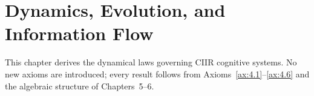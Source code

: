 %
%
%
%

%
%

\section{Dynamics, Evolution, and Information Flow}
\label{sec:ch7:dynamics}

This chapter derives the dynamical laws governing CIIR cognitive systems.
No new axioms are introduced; every result follows from
Axioms~\ref{ax:4.1}--\ref{ax:4.6} and the algebraic structure of
Chapters~5--6.

